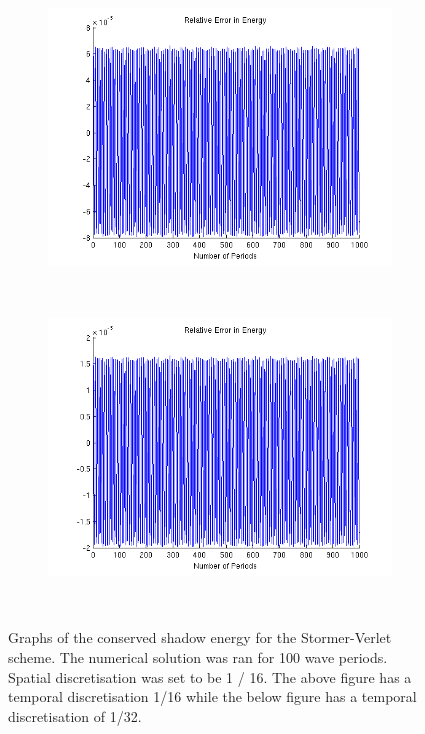 \documentclass[a4paper,11pt]{article}
\begin{document}
\begin{figure}
    \centering
    \begin{subfigure}[b]{0.75\textwidth}
        \includegraphics[width=\textwidth]{error2.png}
            \end{subfigure}
    ~ %
    \begin{subfigure}[b]{0.75\textwidth}
        \includegraphics[width=\textwidth]{error3.png}
                \end{subfigure}
    ~ %
  
    \caption{Graphs of the conserved shadow energy for the Stormer-Verlet scheme. The numerical solution was ran for 100 wave periods. Spatial  discretisation was set to be 1 / 16. The above figure has a temporal discretisation 1/16 while the below figure has a temporal discretisation of 1/32. }\label{fig:animals}
      \label{test2}
\end{figure}
\end{document}
